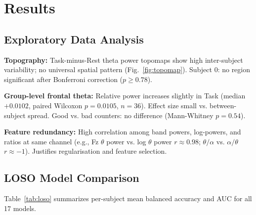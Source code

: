 \documentclass[conference]{IEEEtran}
\begin{document}
\section{Results}

\subsection{Exploratory Data Analysis}
\textbf{Topography:} Task-minus-Rest theta power topomaps show high inter-subject variability; no universal spatial pattern (Fig.~\ref{fig:topomap}). Subject 0: no region significant after Bonferroni correction ($p \ge 0.78$).

\textbf{Group-level frontal theta:} Relative power increases slightly in Task (median $+0.0102$, paired Wilcoxon $p=0.0105$, $n=36$). Effect size small vs. between-subject spread. Good vs. bad counters: no difference (Mann-Whitney $p=0.54$).

\textbf{Feature redundancy:} High correlation among band powers, log-powers, and ratios at same channel (e.g., Fz $\theta$ power vs. log $\theta$ power $r \approx 0.98$; $\theta/\alpha$ vs. $\alpha/\theta$ $r \approx -1$). Justifies regularisation and feature selection.

\subsection{LOSO Model Comparison}
\label{sec:loso_results}
Table~\ref{tab:loso} summarizes per-subject mean balanced accuracy and AUC for all \num{17} models.
\end{document}
